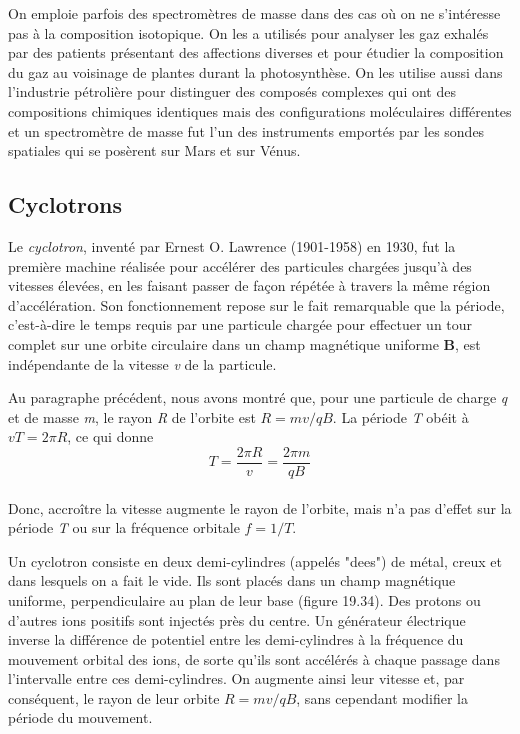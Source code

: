 \documentclass[../main.tex]{subfiles}
\begin{document}
\par On emploie parfois des spectromètres de masse dans des cas où on ne s'intéresse pas à la composition isotopique. On les a utilisés pour analyser les gaz exhalés par des patients présentant des affections diverses et pour étudier la composition du gaz au voisinage de plantes durant la photosynthèse. On les utilise aussi dans l'industrie pétrolière pour distinguer des composés complexes qui ont des compositions chimiques identiques mais des configurations moléculaires différentes et un spectromètre de masse fut l'un des instruments emportés par les sondes spatiales qui se posèrent sur Mars et sur Vénus.
\subsection*{Cyclotrons}
Le \textit{cyclotron}, inventé par Ernest O. Lawrence (1901-1958) en 1930, fut la première machine réalisée pour accélérer des particules chargées jusqu'à des vitesses élevées, en les faisant passer de façon répétée à travers la même région d'accélération. Son fonctionnement  repose sur le fait remarquable que la période, c'est-à-dire le temps requis par une particule chargée pour effectuer un tour complet sur une orbite circulaire dans un champ magnétique uniforme \textbf{B}, est indépendante de la vitesse \textit{v} de la particule.\\
\par Au paragraphe précédent, nous avons montré que, pour une particule de charge \textit{q} et de masse \textit{m}, le rayon \textit{R} de l'orbite est $R = mv/qB$. La période \textit{T} obéit à $vT = 2\pi R$, ce qui donne \\
$$T = \frac{2 \pi R}{v} = \frac{2 \pi m}{qB}$$
\\
Donc, accroître la vitesse augmente le rayon de l'orbite, mais n'a pas d'effet sur la période \textit{T} ou sur la fréquence orbitale $f = 1/T$.\\
\par Un cyclotron consiste en deux demi-cylindres (appelés "dees") de métal, creux et dans lesquels on a fait le vide. Ils sont placés dans un champ magnétique uniforme, perpendiculaire au plan de leur base (figure 19.34). Des protons ou d'autres ions positifs sont injectés près du centre. Un générateur électrique inverse la différence de potentiel entre les demi-cylindres à la fréquence du mouvement orbital des ions, de sorte qu'ils sont accélérés à chaque passage dans l'intervalle entre ces demi-cylindres. On augmente ainsi leur vitesse et, par conséquent, le rayon de leur orbite $R = mv/qB$, sans cependant modifier la période du mouvement.\\
\end{document}
